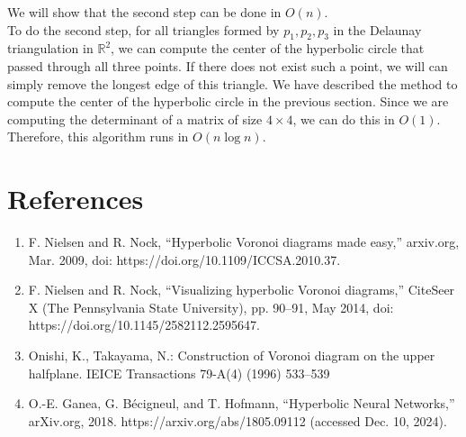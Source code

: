 \documentclass[minted, draw]{hebdomon}
\newcommand{\R}{{\mathbb{R} }}
\begin{document}
We will show that the second step can be done in $O(n)$. \\

To do the second step, for all triangles formed by $p_1, p_2, p_3$ in the Delaunay triangulation in $\R^2$, we can compute the center of the hyperbolic circle that passed through all three points. If there does not exist such a point, we will can simply remove the longest edge of this triangle. We have described the method to compute the center of the hyperbolic circle in the previous section. Since we are computing the determinant of a matrix of size $4 \times 4$, we can do this in $O(1)$. Therefore, this algorithm runs in $O(n \log n)$.

\newpage 
\section*{References}
\begin{enumerate}
    \item F. Nielsen and R. Nock, “Hyperbolic Voronoi diagrams made easy,” arxiv.org, Mar. 2009, doi: https://doi.org/10.1109/ICCSA.2010.37.
    \item F. Nielsen and R. Nock, “Visualizing hyperbolic Voronoi diagrams,” CiteSeer X (The Pennsylvania State University), pp. 90–91, May 2014, doi: https://doi.org/10.1145/2582112.2595647.
    \item Onishi, K., Takayama, N.: Construction of Voronoi diagram on the upper halfplane. IEICE Transactions 79-A(4) (1996) 533–539
    \item O.-E. Ganea, G. Bécigneul, and T. Hofmann, “Hyperbolic Neural Networks,” arXiv.org, 2018. https://arxiv.org/abs/1805.09112 (accessed Dec. 10, 2024).
\end{enumerate}
\end{document}
